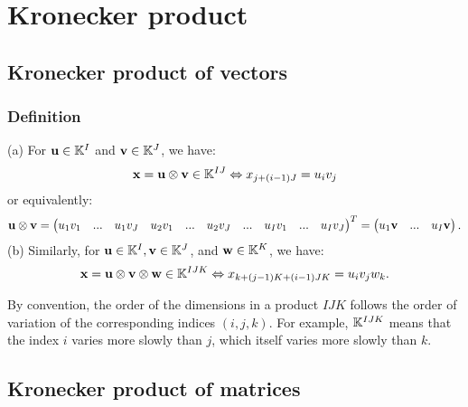 \section{Kronecker product}

\subsection{Kronecker product of vectors}
\subsubsection{Definition}
\begin{definition}{}{}
    (a) For $\bold{u}\in \mathbb{K}^I$ and $\bold{v}\in \mathbb{K}^J$, we have:
    \begin{align*}
        \bold{x}=\bold{u}\otimes \bold{v}\in \mathbb{K}^{IJ}\Leftrightarrow x_{j+(i-1)J}=u_iv_j
    \end{align*}
    or equivalently:
    \begin{align*}
        \bold{u}\otimes \bold{v}=\begin{pmatrix}
            u_1v_1& ... & u_1v_J& u_2v_1&...& u_2v_J&...& u_Iv_1&...& u_Iv_J
        \end{pmatrix}^T=\begin{pmatrix}
            u_1\bold{v}&...&u_I\bold{v}
        \end{pmatrix}.
    \end{align*}
    (b) Similarly, for $\bold{u}\in \mathbb{K}^{I}, \bold{v}\in \mathbb{K}^J$, and $\bold{w}\in\mathbb{K}^K$, we have:
    \begin{align*}
        \bold{x}=\bold{u}\otimes \bold{v}\otimes \bold{w}\in \mathbb{K}^{IJK}\Leftrightarrow x_{k+(j-1)K+(i-1)JK}=u_iv_jw_k.
    \end{align*}
\end{definition}
\begin{remark}
    By convention, the order of the dimensions in a product $IJK$ follows
    the order of variation of the corresponding indices $(i,j,k)$. For example,
    $\mathbb{K}^{IJK}$ means that the index $i$ varies more slowly than $j$, which itself varies more slowly than $k$.
\end{remark}

\subsection{Kronecker product of matrices}

